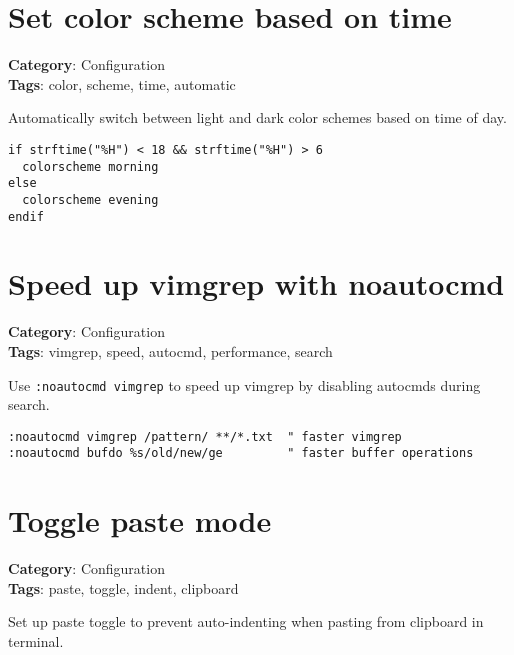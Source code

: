 {{{{\section{Set color scheme based on time}

\textbf{Category}: Configuration\\ \textbf{Tags}: color, scheme, time, automatic
\vspace{0.5cm}

Automatically switch between light and dark color schemes based on time of day.

\begin{Exa*}{}
\begin{Verbatim}[fontsize=\footnotesize, breaklines, breakanywhere]
if strftime("%H") < 18 && strftime("%H") > 6
  colorscheme morning
else
  colorscheme evening
endif
\end{Verbatim}
\end{Exa*}

\section{Speed up vimgrep with noautocmd}

\textbf{Category}: Configuration\\ \textbf{Tags}: vimgrep, speed, autocmd, performance, search
\vspace{0.5cm}

Use {\footnotesize \Verb§:noautocmd vimgrep§} to speed up vimgrep by disabling autocmds during search.

\begin{Exa*}{}
\begin{Verbatim}[fontsize=\footnotesize, breaklines, breakanywhere]
:noautocmd vimgrep /pattern/ **/*.txt  " faster vimgrep
:noautocmd bufdo %s/old/new/ge         " faster buffer operations
\end{Verbatim}
\end{Exa*}

\section{Toggle paste mode}

\textbf{Category}: Configuration\\ \textbf{Tags}: paste, toggle, indent, clipboard
\vspace{0.5cm}

Set up paste toggle to prevent auto-indenting when pasting from clipboard in terminal.

}}}}
